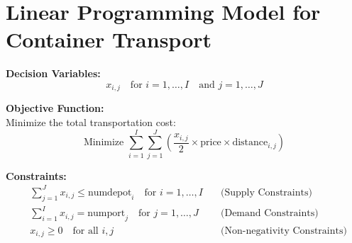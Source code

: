 \documentclass{article}
\begin{document}
\section*{Linear Programming Model for Container Transport}

\textbf{Decision Variables:}\\
\[ x_{i,j} \quad \text{for } i = 1, \ldots, I \quad \text{and } j = 1, \ldots, J \]

\textbf{Objective Function:}\\
Minimize the total transportation cost:
\[
\text{Minimize } \sum_{i=1}^{I} \sum_{j=1}^{J} \left( \frac{x_{i,j}}{2} \times \text{price} \times \text{distance}_{i,j} \right)
\]

\textbf{Constraints:}
\begin{align*}
& \sum_{j=1}^{J} x_{i,j} \leq \text{numdepot}_i \quad \text{for } i = 1, \ldots, I \quad & \text{(Supply Constraints)} \\
& \sum_{i=1}^{I} x_{i,j} = \text{numport}_j \quad \text{for } j = 1, \ldots, J \quad & \text{(Demand Constraints)} \\
& x_{i,j} \geq 0 \quad \text{for all } i, j \quad & \text{(Non-negativity Constraints)}
\end{align*}
\end{document}
